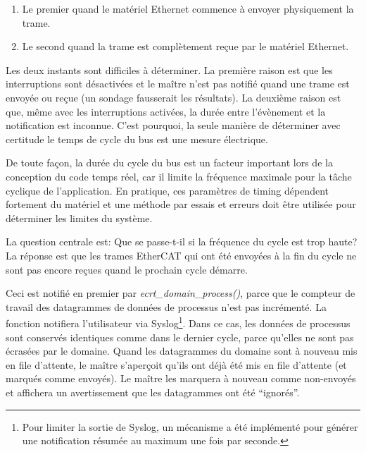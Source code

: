 \documentclass[a4paper,12pt,BCOR=6mm,bibtotoc,idxtotoc]{scrbook}
\begin{document}
\begin{enumerate}

\item Le premier quand le mat\'eriel Ethernet commence \`a envoyer physiquement
  la trame.

\item Le second quand la trame est compl\`etement re\c{c}ue par le mat\'eriel
  Ethernet.

\end{enumerate}

Les deux instants sont difficiles \`a d\'eterminer.  La premi\`ere
raison est que les interruptions sont d\'esactiv\'ees et le ma\^itre
n'est pas notifi\'e quand une trame est envoy\'ee ou re\c{c}ue (un
sondage fausserait les r\'esultats).  La deuxi\`eme raison est que,
m\^eme avec les interruptions activ\'ees, la dur\'ee entre
l'\'ev\`enement et la notification est inconnue.  C'est pourquoi, la
seule mani\`ere de d\'eterminer avec certitude le temps de cycle du
bus est une mesure \'electrique.

De toute fa\c{c}on, la dur\'ee du cycle du bus est un facteur
important lors de la conception du code temps r\'eel, car il limite la
fr\'equence maximale pour la t\^ache cyclique de l'application.  En
pratique, ces param\`etres de timing d\'ependent fortement du
mat\'eriel et une m\'ethode par essais et erreurs doit \^etre
utilis\'ee pour d\'eterminer les limites du syst\`eme.

La question centrale est: Que se passe-t-il si la fr\'equence du cycle
est trop haute?  La r\'eponse est que les trames EtherCAT qui ont
\'et\'e envoy\'ees \`a la fin du cycle ne sont pas encore re\c{c}ues
quand le prochain cycle d\'emarre.

Ceci est notifi\'e en premier par \textit{ecrt\_domain\_process()},
parce que le compteur de travail des datagrammes de donn\'ees de
processus n'est pas incr\'ement\'e.  La fonction notifiera
l'utilisateur via Syslog\footnote{ Pour limiter la sortie de Syslog,
  un m\'ecanisme a \'et\'e impl\'ement\'e pour g\'en\'erer une
  notification r\'esum\'ee au maximum une fois par seconde.}.  Dans ce
cas, les donn\'ees de processus sont conserv\'es identiques comme dans
le dernier cycle, parce qu'elles ne sont pas \'ecras\'ees par le
domaine.  Quand les datagrammes du domaine sont \`a nouveau mis en
file d'attente, le ma\^itre s'aper\c{c}oit qu'ils ont d\'ej\`a \'et\'e
mis en file d'attente (et marqu\'es comme envoy\'es). Le ma\^itre les
marquera \`a nouveau comme non-envoy\'es et affichera un avertissement
que les datagrammes ont \'et\'e ``ignor\'es''.
\end{document}
